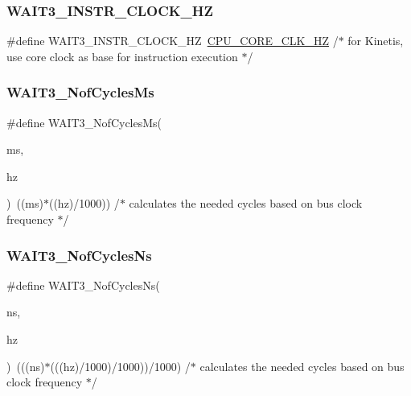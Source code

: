 \subsubsection{\texorpdfstring{W\+A\+I\+T3\+\_\+\+I\+N\+S\+T\+R\+\_\+\+C\+L\+O\+C\+K\+\_\+\+HZ}{WAIT3\_INSTR\_CLOCK\_HZ}}
{\footnotesize\ttfamily \#define W\+A\+I\+T3\+\_\+\+I\+N\+S\+T\+R\+\_\+\+C\+L\+O\+C\+K\+\_\+\+HZ~\hyperlink{group___cpu__module_ga9dee0abd722c849e54c662ab11a1d2cf}{C\+P\+U\+\_\+\+C\+O\+R\+E\+\_\+\+C\+L\+K\+\_\+\+HZ} /$\ast$ for Kinetis, use core clock as base for instruction execution $\ast$/}

\mbox{\label{group___w_a_i_t3__module_ga0161409e4b16cae22dad9e1a5c579d4f}} 
\subsubsection{\texorpdfstring{W\+A\+I\+T3\+\_\+\+Nof\+Cycles\+Ms}{WAIT3\_NofCyclesMs}}
{\footnotesize\ttfamily \#define W\+A\+I\+T3\+\_\+\+Nof\+Cycles\+Ms(\begin{DoxyParamCaption}\item[{}]{ms,  }\item[{}]{hz }\end{DoxyParamCaption})~((ms)$\ast$((hz)/1000)) /$\ast$ calculates the needed cycles based on bus clock frequency $\ast$/}

\mbox{\label{group___w_a_i_t3__module_ga493da4e9ba3ac2a580caaaed67b772ba}} 
\subsubsection{\texorpdfstring{W\+A\+I\+T3\+\_\+\+Nof\+Cycles\+Ns}{WAIT3\_NofCyclesNs}}
{\footnotesize\ttfamily \#define W\+A\+I\+T3\+\_\+\+Nof\+Cycles\+Ns(\begin{DoxyParamCaption}\item[{}]{ns,  }\item[{}]{hz }\end{DoxyParamCaption})~(((ns)$\ast$(((hz)/1000)/1000))/1000) /$\ast$ calculates the needed cycles based on bus clock frequency $\ast$/}

